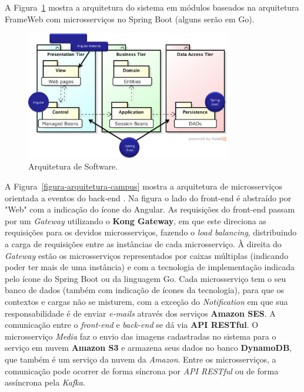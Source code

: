 A Figura~\ref{figura-arquitetura} mostra a arquitetura do sistema em módulos baseados na arquitetura FrameWeb \emph{\imprimirtitulo} com microsserviços no Spring Boot (alguns serão em Go).

\begin{figure}[h]
	\centering
	\includegraphics[width=0.8\textwidth]{figuras/arquitetura-frameweb.png}
	\caption{Arquitetura de Software.}
	\label{figura-arquitetura}
\end{figure}

A Figura~\ref{figura-arquitetura-campus} mostra a arquitetura de microsserviços orientada a eventos do back-end \emph{\imprimirtitulo}. Na figura o lado do front-end é abstraído por "Web" com a indicação do ícone do Angular. As requisições do front-end passam por um \textit{Gateway} utilizando o \textbf{Kong Gateway}, em que este direciona as requisições para os devidos microsserviços, fazendo o \textit{load balancing}, distribuindo a carga de requisições entre as instâncias de cada microsserviço. À direita do \textit{Gateway} estão os microsserviços representados por caixas múltiplas (indicando poder ter mais de uma instância) e com a tecnologia de implementação indicada pelo ícone do Spring Boot ou da linguagem Go. Cada microsserviço tem o seu banco de dados (também com indicação de ícones da tecnologia), para que os contextos e cargas não se misturem, com a exceção do \textit{Notification} em que sua responsabilidade é de enviar \textit{e-mails} através dos serviços \textbf{Amazon SES}. A comunicação entre o \textit{front-end} e \textit{back-end} se dá via \textbf{API RESTful}. O microsserviço \textit{Media} faz o envio das imagens cadastradas no sistema para o serviço em nuvem \textbf{Amazon S3} e armazena seus dados no banco \textbf{DynamoDB}, que também é um serviço da nuvem da \textit{Amazon}. Entre os microsserviços, a comunicação pode ocorrer de forma síncrona por \textit{API RESTful} ou de forma assíncrona pela \textit{Kafka}.

